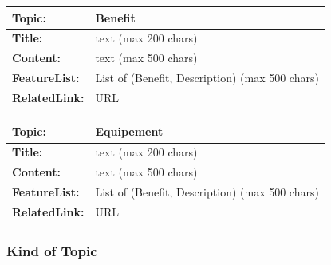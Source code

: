 \documentclass{article}
\begin{document}
\begin{center}
        \begin{tabularx}{\textwidth}{|>{\bfseries}l|X|}
                \hline
                Topic: & \textbf{Benefit} \\
                \hline
                Title: & text  (max 200 chars)\\
                \hline
                Content: & text (max 500 chars) \\
                \hline
                FeatureList: & List of {(Benefit, Description)} (max 500 chars)\\
                \hline
                RelatedLink: & URL \\
                \hline

        \end{tabularx}
        \caption{Table: Benefit}
\end{center}


\begin{center}
        \begin{tabularx}{\textwidth}{|>{\bfseries}l|X|}
                \hline
                Topic: & \textbf{Equipement} \\
                \hline
                Title: & text  (max 200 chars)\\
                \hline
                Content: & text (max 500 chars) \\
                \hline
                FeatureList: & List of {(Benefit, Description)} (max 500 chars)\\
                \hline
                RelatedLink: & URL \\
                \hline

        \end{tabularx}
        \caption{Table: Equipement}
\end{center}

\subsubsection{Kind of Topic}
\end{document}
